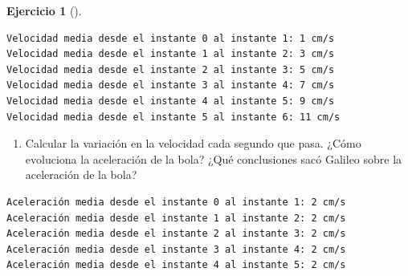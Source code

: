 \documentclass[
  a4paper,
]{scrreport}
\newenvironment{Shaded}{\begin{snugshade}}{\end{snugshade}}
\newcommand{\ControlFlowTok}[1]{\textcolor[rgb]{0.00,0.23,0.31}{#1}}
\newcommand{\FloatTok}[1]{\textcolor[rgb]{0.68,0.00,0.00}{#1}}
\newcommand{\FunctionTok}[1]{\textcolor[rgb]{0.28,0.35,0.67}{#1}}
\newcommand{\KeywordTok}[1]{\textcolor[rgb]{0.00,0.23,0.31}{#1}}
\newcommand{\NormalTok}[1]{\textcolor[rgb]{0.00,0.23,0.31}{#1}}
\newcommand{\OperatorTok}[1]{\textcolor[rgb]{0.37,0.37,0.37}{#1}}
\newcommand{\SpecialCharTok}[1]{\textcolor[rgb]{0.37,0.37,0.37}{#1}}
\newcommand{\StringTok}[1]{\textcolor[rgb]{0.13,0.47,0.30}{#1}}
\providecommand{\tightlist}{%
  \setlength{\itemsep}{0pt}\setlength{\parskip}{0pt}}\usepackage{longtable,booktabs,array}
\theoremstyle{definition}
\newtheorem{exercise}{Ejercicio}[chapter]
\theoremstyle{remark}
\begin{document}
\begin{exercise}[]
\begin{tcolorbox}
\begin{verbatim}
Velocidad media desde el instante 0 al instante 1: 1 cm/s
Velocidad media desde el instante 1 al instante 2: 3 cm/s
Velocidad media desde el instante 2 al instante 3: 5 cm/s
Velocidad media desde el instante 3 al instante 4: 7 cm/s
Velocidad media desde el instante 4 al instante 5: 9 cm/s
Velocidad media desde el instante 5 al instante 6: 11 cm/s
\end{verbatim}

\end{tcolorbox}

\begin{enumerate}
\def\labelenumi{\alph{enumi}.}
\setcounter{enumi}{4}
\tightlist
\item
  Calcular la variación en la velocidad cada segundo que pasa. ¿Cómo
  evoluciona la aceleración de la bola? ¿Qué conclusiones sacó Galileo
  sobre la aceleración de la bola?
\end{enumerate}

\begin{tcolorbox}[enhanced jigsaw, toprule=.15mm, arc=.35mm, bottomrule=.15mm, titlerule=0mm, bottomtitle=1mm, opacitybacktitle=0.6, colbacktitle=quarto-callout-tip-color!10!white, colframe=quarto-callout-tip-color-frame, opacityback=0, title=\textcolor{quarto-callout-tip-color}{\faLightbulb}\hspace{0.5em}{Solución}, breakable, colback=white, toptitle=1mm, leftrule=.75mm, coltitle=black, rightrule=.15mm, left=2mm]

\begin{Shaded}
\end{Shaded}

\begin{verbatim}
Aceleración media desde el instante 0 al instante 1: 2 cm/s
Aceleración media desde el instante 1 al instante 2: 2 cm/s
Aceleración media desde el instante 2 al instante 3: 2 cm/s
Aceleración media desde el instante 3 al instante 4: 2 cm/s
Aceleración media desde el instante 4 al instante 5: 2 cm/s
\end{verbatim}

\end{tcolorbox}

\end{exercise}
\end{document}
